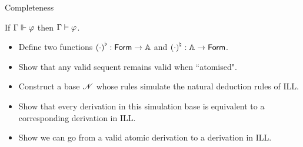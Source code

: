 \documentclass{beamer}
\begin{document}
\begin{frame}{Completeness}
	\begin{theorem}[Completeness]
		\centering
		If $\Gamma\Vdash_{ \!\! }^{ \!\! }\varphi$ then $\Gamma\vdash\varphi$.
	\end{theorem}
	\pause
	\begin{itemize}
		\item Define two functions ${(\cdot)}^{\flat}:\mathsf{Form} \rightarrow \mathbb{A}$ and ${(\cdot)}^{\natural}:\mathbb{A}\rightarrow\mathsf{Form}$.
		\item Show that any valid sequent remains valid when ``atomised".
		\item Construct a base $\mathscr{N}$ whose rules simulate the natural deduction rules of ILL.
		\item Show that every derivation in this simulation base is equivalent to a corresponding derivation in ILL.
		\item Show we can go from a valid atomic derivation to a derivation in ILL.
	\end{itemize}
\end{frame}
\end{document}
